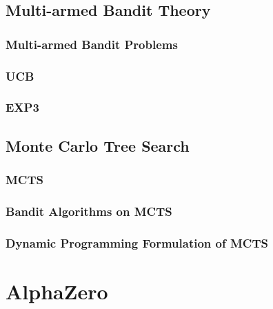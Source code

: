 \documentclass{beamer}
\begin{document}

\subsection{Multi-armed Bandit Theory}

\begin{frame}
\frametitle{Multi-armed Bandit Problems}
\end{frame}


\begin{frame}
\frametitle{UCB}
\end{frame}



\begin{frame}
\frametitle{EXP3}
\end{frame}


\subsection{Monte Carlo Tree Search}


\begin{frame}
\frametitle{MCTS}
\end{frame}



\begin{frame}
\frametitle{Bandit Algorithms on MCTS}
\end{frame}



\begin{frame}
\frametitle{Dynamic Programming Formulation of MCTS}
\end{frame}


\section{AlphaZero}
\end{document}
